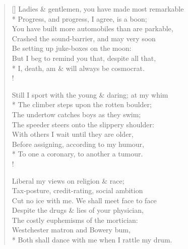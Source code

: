 \documentclass[MAIN]{subfiles}
\begin{document}
\settowidth{\versewidth}{Ladies \& gentlemen, you have made most remarkable}
\begin{verse}[\versewidth]
Ladies \& gentlemen, you have made most remarkable\\*
\vin Progress, and progress, I agree, is a boon;\\
You have built more automobiles than are parkable,\\
\vin Crashed the sound-barrier, and may very soon\\
\vin Be setting up juke-boxes on the moon:\\
But I beg to remind you that, despite all that,\\*
I, death, am \& will always be cosmocrat.\\!

Still I sport with the young \& daring; at my whim\\*
\vin The climber steps upon the rotten boulder;\\
The undertow catches boys as they swim;\\
\vin The speeder steers onto the slippery shoulder:\\
\vin With others I wait until they are older,\\
Before assigning, according to my humour,\\*
To one a coronary, to another a tumour.\\!

Liberal my views on religion \& race;\\
Tax-posture, credit-rating, social ambition\\
Cut no ice with me. We shall meet face to face\\
\vin Despite the drugs \& lies of your physician,\\
\vin The costly euphemisms of the mortician:\\
{\sc Westchester} matron and {\sc Bowery} bum,\\*
Both shall dance with me when I rattle my drum.
\end{verse}
\end{document}
